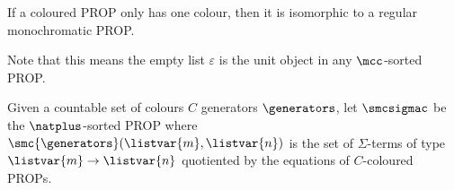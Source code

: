 \begin{remark}
    If a coloured PROP only has one colour, then it is isomorphic to a regular
    monochromatic PROP.
\end{remark}

Note that this means the empty list \(\varepsilon\) is the unit
object in any \(\mcc\)-sorted PROP.

\begin{definition}\label{def:freely-generated-coloured-prop}
    Given a countable set of colours \(C\) generators \(\generators\), let
    \(\smcsigmac\) be the
    \(\natplus\)-sorted PROP where
    \(\smc{\generators}(\listvar{m}, \listvar{n})\) is the set of
    \(\Sigma\)-terms of type \(\listvar{m} \to \listvar{n}\) quotiented by
    the equations of \(C\)-coloured PROPs.
\end{definition}
